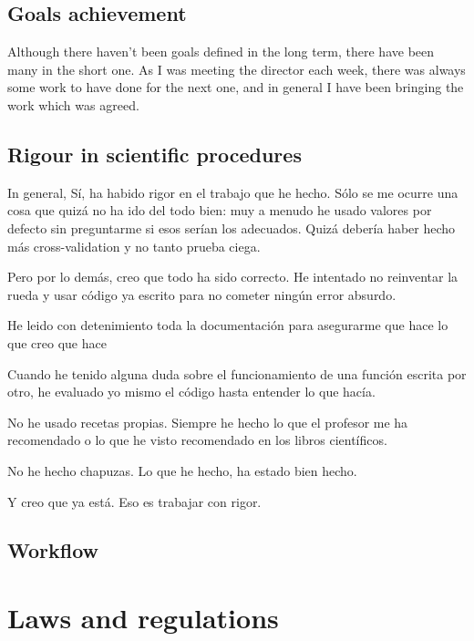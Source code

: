\documentclass{article}
\begin{document}
    \subsection{Goals achievement}
    Although there haven't been goals defined in the long term, there have been
    many in the short one. As I was meeting the director each week, there was
    always some work to have done for the next one, and in general I have been
    bringing the work which was agreed.

    \subsection{Rigour in scientific procedures}
    In general,
    Sí, ha habido rigor en el trabajo que he hecho. Sólo se me ocurre una cosa
    que quizá no ha ido del todo bien: muy a menudo he usado valores por
    defecto sin preguntarme si esos serían los adecuados.
    Quizá debería haber hecho más cross-validation y no tanto prueba ciega.

    Pero por lo demás, creo que todo ha sido correcto. He intentado no reinventar
    la rueda y usar código ya escrito para no cometer ningún error absurdo.

    He leido con detenimiento toda la documentación para asegurarme que hace lo
    que creo que hace

    Cuando he tenido alguna duda sobre el funcionamiento de una función escrita
    por otro, he evaluado yo mismo el código hasta entender lo que hacía.

    No he usado recetas propias. Siempre he hecho lo que el profesor me ha
    recomendado o lo que he visto recomendado en los libros científicos.

    No he hecho chapuzas. Lo que he hecho, ha estado bien hecho.

    Y creo que ya está. Eso es trabajar con rigor.
    \subsection{Workflow}

\section{Laws and regulations}
\end{document}

